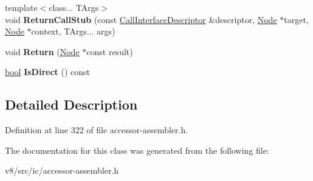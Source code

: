 \begin{DoxyCompactItemize}
\mbox{\label{classv8_1_1internal_1_1ExitPoint_a3b2933f1625c226cd1252370360b5a02}} 
{\footnotesize template$<$class... T\+Args$>$ }\\void {\bfseries Return\+Call\+Stub} (const \mbox{\hyperlink{classv8_1_1internal_1_1CallInterfaceDescriptor}{Call\+Interface\+Descriptor}} \&descriptor, \mbox{\hyperlink{classv8_1_1internal_1_1compiler_1_1Node}{Node}} $\ast$target, \mbox{\hyperlink{classv8_1_1internal_1_1compiler_1_1Node}{Node}} $\ast$context, T\+Args... args)
\item 
\mbox{\label{classv8_1_1internal_1_1ExitPoint_ae57cf5131769ec4cc18015b863b92fe9}} 
void {\bfseries Return} (\mbox{\hyperlink{classv8_1_1internal_1_1compiler_1_1Node}{Node}} $\ast$const result)
\item 
\mbox{\label{classv8_1_1internal_1_1ExitPoint_a1240665126dda24308be1e9c14c760fb}} 
\mbox{\hyperlink{classbool}{bool}} {\bfseries Is\+Direct} () const
\end{DoxyCompactItemize}


\subsection{Detailed Description}


Definition at line 322 of file accessor-\/assembler.\+h.



The documentation for this class was generated from the following file\+:\begin{DoxyCompactItemize}
\item 
v8/src/ic/accessor-\/assembler.\+h\end{DoxyCompactItemize}
